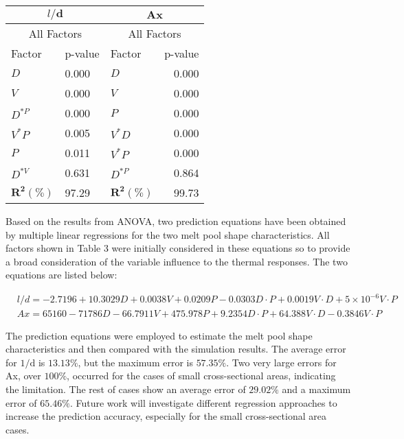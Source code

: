 \documentclass[10pt]{article}
\begin{document}
\begin{center}
\begin{tabular}{l|l|l|r}
\hline
\multicolumn{2}{c||}{$l / \boldsymbol{d}$} & \multicolumn{2}{c}{$\boldsymbol{A x}$} \\
\hline
\multicolumn{2}{c|}{All Factors} & \multicolumn{2}{c}{All Factors} \\
\hline
Factor & p-value & Factor & p-value \\
\hline
$D$ & 0.000 & $D$ & 0.000 \\
$V$ & 0.000 & $V$ & 0.000 \\
$D^{* P}$ & 0.000 & $P$ & 0.000 \\
$V^{*} P$ & 0.005 & $V^{*} D$ & 0.000 \\
$P$ & 0.011 & $V^{*} P$ & 0.000 \\
$D^{* V}$ & 0.631 & $D^{* P}$ & 0.864 \\
\hline
$\boldsymbol{R}^{\mathbf{2}} \mathbf{( \% )}$ & 97.29 & $\boldsymbol{R}^{\mathbf{2}} \mathbf{( \% )}$ & 99.73 \\
\hline\hline
\end{tabular}
\end{center}

Based on the results from ANOVA, two prediction equations have been obtained by multiple linear regressions for the two melt pool shape characteristics. All factors shown in Table 3 were initially considered in these equations so to provide a broad consideration of the variable influence to the thermal responses. The two equations are listed below:


\begin{align*}
& l / d=-2.7196+10.3029 D+0.0038 V+0.0209 P-0.0303 D \cdot P+0.0019 V \cdot D+5 \times 10^{-6} V \cdot P  \tag{1}\\
& A x=65160-71786 D-66.7911 V+475.978 P+9.2354 D \cdot P+64.388 V \cdot D-0.3846 V \cdot P \tag{2}
\end{align*}


The prediction equations were employed to estimate the melt pool shape characteristics and then compared with the simulation results. The average error for $1 / \mathrm{d}$ is $13.13 \%$, but the maximum error is $57.35 \%$. Two very large errors for Ax, over $100 \%$, occurred for the cases of small cross-sectional areas, indicating the limitation. The rest of cases show an average error of $29.02 \%$ and a maximum error of $65.46 \%$. Future work will investigate different regression approaches to increase the prediction accuracy, especially for the small cross-sectional area cases.
\end{document}
